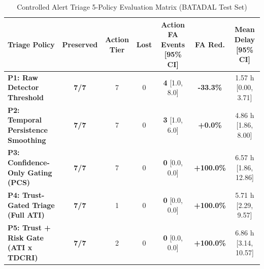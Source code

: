 \begin{table}[htbp]
\centering
\caption{Controlled Alert Triage 5-Policy Evaluation Matrix (BATADAL Test Set)}
\label{tab:core_triage}
\begin{tabular}{lcccccc}
\toprule
Triage Policy & Preserved & Action Tier & Lost & Action FA Events [95\% CI] & FA Red. & Mean Delay [95\% CI] \\
\midrule
\textbf{P1: Raw Detector Threshold} & \textbf{7/7} & 7 & 0 & \textbf{4} [1.0, 8.0] & \textbf{-33.3\%} & 1.57 h [0.00, 3.71] \\
\textbf{P2: Temporal Persistence Smoothing} & \textbf{7/7} & 7 & 0 & \textbf{3} [1.0, 6.0] & \textbf{+0.0\%} & 4.86 h [1.86, 8.00] \\
\textbf{P3: Confidence-Only Gating (PCS)} & \textbf{7/7} & 7 & 0 & \textbf{0} [0.0, 0.0] & \textbf{+100.0\%} & 6.57 h [1.86, 12.86] \\
\textbf{P4: Trust-Gated Triage (Full ATI)} & \textbf{7/7} & 1 & 0 & \textbf{0} [0.0, 0.0] & \textbf{+100.0\%} & 5.71 h [2.29, 9.57] \\
\textbf{P5: Trust + Risk Gate (ATI x TDCRI)} & \textbf{7/7} & 2 & 0 & \textbf{0} [0.0, 0.0] & \textbf{+100.0\%} & 6.86 h [3.14, 10.57] \\
\bottomrule
\end{tabular}
\end{table}
